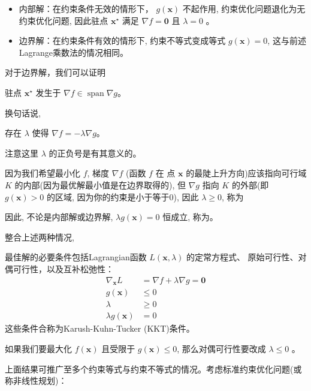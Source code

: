 \begin{itemize}
    \item 内部解：在约束条件无效的情形下， $ g(\mathbf{x}) $ 不起作用, 约束优化问题退化为无约束优化问题, 因此驻点 $ \mathbf{x}^{\star} $ 满足 $ \nabla f=\mathbf{0} $ 且 $ \lambda=0 $ 。
    \item 边界解：在约束条件有效的情形下, 约束不等式变成等式 $g(\mathbf{x})=0$, 这与前述Lagrange乘数法的情况相同。
\end{itemize}

对于边界解，我们可以证明

\begin{theorem}
    驻点 $\mathbf{x}^{\star}$ 发生于 $\nabla f \in \operatorname{span} \nabla g$。
\end{theorem}
换句话说, 

\begin{corollary}
    存在 $\lambda$ 使得 $\nabla f=-\lambda \nabla g$。

    注意这里 $\lambda$ 的正负号是有其意义的。
\end{corollary}

因为我们希望最小化 $f$, 梯度 $\nabla f$ (函数 $f$ 在 点 $\mathbf{x}$ 的最陡上升方向)应该指向可行域 $K$ 的内部(因为最优解最小值是在边界取得的), 但 $\nabla g$ 指向 $K$ 的外部(即 $g(\mathbf{x})>0$ 的区域, 因为你的约束是小于等于0), 因此 $\lambda \geq 0$, 称为

因此, 不论是内部解或边界解, $\lambda g(\mathbf{x})=0$ 恒成立, 称为。

整合上述两种情况, 

\begin{theorem}
    最佳解的必要条件包括Lagrangian函数 $L(\mathbf{x}, \lambda)$ 的定常方程式、 原始可行性、对偶可行性，以及互补松弛性：
$$
\begin{aligned}
\nabla_{\mathbf{x}} L &=\nabla f+\lambda \nabla g=\mathbf{0} \\
g(\mathbf{x}) & \leq 0 \\
\lambda & \geq 0 \\
\lambda g(\mathbf{x}) &=0
\end{aligned}
$$
这些条件合称为Karush-Kuhn-Tucker (KKT)条件。

如果我们要最大化 $f(\mathbf{x})$ 且受限于 $g(\mathbf{x}) \leq 0$, 那么对偶可行性要改成 $\lambda \leq 0$ 。
\end{theorem}


上面结果可推广至多个约束等式与约束不等式的情况。考虑标准约束优化问题(或称非线性规划)：

